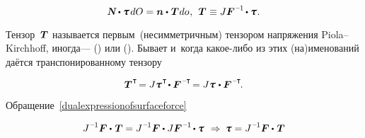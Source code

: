 \begin{otherlanguage}{russian}
\nopagebreak\vspace{-0.16em}\begin{equation}\label{dualexpressionofsurfaceforce}
\mathboldN \dotp \cauchystress \hspace{.25ex} dO
= \bm{n} \dotp \hspace{.12ex} \firstpiolakirchhoffstress \hspace{.1ex} do
\hspace{.1ex}, \:\:
\firstpiolakirchhoffstress \hspace{.1ex} \equiv J \bm{F}^{\hspace{.1ex}\expminusone} \hspace{-0.2ex} \dotp \cauchystress \hspace{.1ex}.
\end{equation}

\vspace{-0.2em} Тензор~${\hspace{.1ex}\bm{T}}$ называется первым~(несимметричным) тензором напряжения Piola--Kirchhoff, иногда\:---  () или  (). Бывает и~когда какое\hbox{-}либо из этих (на)именований даётся транспонированному тензору

\nopagebreak\vspace{-0.1em}\begin{equation*}
\firstpiolakirchhoffstress^{\hspace{.1ex}\T} \hspace{-0.32ex}
= J \cauchystress^{\hspace{.16ex}\T} \hspace{-0.32ex} \dotp \bm{F}^{\hspace{.1ex}\expminusT} \hspace{-0.32ex}
= J \cauchystress \hspace{.16ex} \dotp \bm{F}^{\hspace{.1ex}\expminusT} \hspace{-0.25ex}.
\end{equation*}

Обращение~\eqref{dualexpressionofsurfaceforce}

\begin{equation*}
J^{\hspace{.12ex}\expminusone} \bm{F} \dotp \hspace{.16ex} \firstpiolakirchhoffstress = J^{\hspace{.12ex}\expminusone} \bm{F} \dotp J \bm{F}^{\hspace{.16ex}\expminusone} \hspace{-0.2ex} \dotp \cauchystress
\:\,\Rightarrow\:
\cauchystress = J^{\hspace{.12ex}\expminusone} \bm{F} \dotp \hspace{.16ex} \firstpiolakirchhoffstress
\end{equation*}


\end{otherlanguage}
